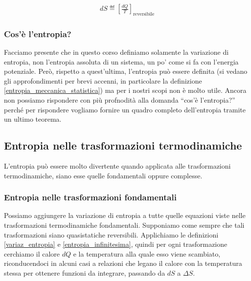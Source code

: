 \begin{align}
    dS \eqdef \left[\frac{dQ}{T}\right]_\text{reversibile}\label{entropia_infinitesima}
\end{align}

\subsubsection*{Cos'è l'entropia?}
Facciamo presente che in questo corso definiamo solamente la variazione
di entropia, non l'entropia assoluta di un sistema, un po' come si fa
con l'energia potenziale. Però, rispetto a quest'ultima, l'entropia
può essere definita (si vedano gli approfondimenti per brevi accenni,
in particolare la definizione \ref{entropia_meccanica_statistica}) ma
per i nostri scopi non è molto utile. Ancora non possiamo rispondere
con più profnodità alla domanda ``cos'è l'entropia?'' perché per
rispondere vogliamo fornire un quadro completo dell'entropia tramite
un ultimo teorema.


\subsection{Entropia nelle trasformazioni termodinamiche}
L'entropia può essere molto divertente quando applicata alle
trasformazioni termodinamiche, siano esse quelle fondamentali
oppure complesse.

\subsubsection{Entropia nelle trasformazioni fondamentali}
Possiamo aggiungere la variazione di entropia a tutte quelle equazioni viste nelle
trasformazioni termodinamiche fondamentali. Supponiamo come sempre
che tali trasformazioni siano quasistatiche reversibili. Applichiamo
le definizioni \ref{variaz_entropia} e \ref{entropia_infinitesima},
quindi per ogni trasformazione cerchiamo il calore $dQ$ e
la temperatura alla quale esso viene scambiato, riconducendoci
in alcuni casi a relazioni che legano il calore con la temperatura
stessa per ottenere funzioni da integrare, passando da $dS$ a $\Delta S$.

